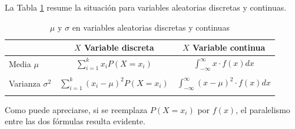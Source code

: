     \begin{center}
    \end{center}
La Tabla \ref{cap05:tablas:MuSigmaFormulasDosTiposVariables} resume la situación para variables aleatorias discretas y continuas.
\begin{table}[h]
    \begin{center}
    \begin{tabular}{|l|c|c|}
    \hline
                        & $X$ Variable discreta& $X$ Variable continua                                                                            \\
    \hline
    Media $\mu$\rule{0cm}{1cm}& $\displaystyle\sum_{i=1}^k x_iP(X=x_i)$         & $\displaystyle \int_{-\infty}^{\infty} x\cdot f(x)dx$         \\
    &&\\
    \hline
    Varianza $\sigma^2$ \rule{0cm}{1cm}& $\displaystyle\sum_{i=1}^k (x_i-\mu)^2P(X=x_i)$ & $\displaystyle \int_{-\infty}^{\infty} (x-\mu)^2\cdot f(x)dx$ \\
    &&\\
    \hline
    \end{tabular}
    \end{center}
\caption{$\mu$ y $\sigma$ en variables aleatorias discretas y continuas}
\label{cap05:tablas:MuSigmaFormulasDosTiposVariables}
\end{table}

Como puede apreciarse, si se reemplaza $P(X=x_i)$ por $f(x)$, el paralelismo entre las dos fórmulas resulta evidente.

